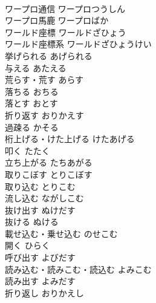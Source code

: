 \documentclass[8pt]{extreport}
\begin{document}
\begin{CJK}{UTF8}{min}
\\	ワープロ通信	ワープロつうしん	
\\	ワープロ馬鹿	ワープロばか	
\\	ワールド座標	ワールドざひょう	
\\	ワールド座標系	ワールドざひょうけい	
\\	挙げられる	あげられる	
\\	与える	あたえる	
\\	荒らす・荒す	あらす	
\\	落ちる	おちる	
\\	落とす	おとす	
\\	折り返す	おりかえす	
\\	過疎る	かそる	
\\	桁上げる・けた上げる	けたあげる	
\\	叩く	たたく	
\\	立ち上がる	たちあがる	
\\	取りこぼす	とりこぼす	
\\	取り込む	とりこむ	
\\	流し込む	ながしこむ	
\\	抜け出す	ぬけだす	
\\	抜ける	ぬける	
\\	載せ込む・乗せ込む	のせこむ	
\\	開く	ひらく	
\\	呼び出す	よびだす	
\\	読み込む・読みこむ・読込む	よみこむ	
\\	読み出す	よみだす	
\\	折り返し	おりかえし	
\end{CJK}
\end{document}
